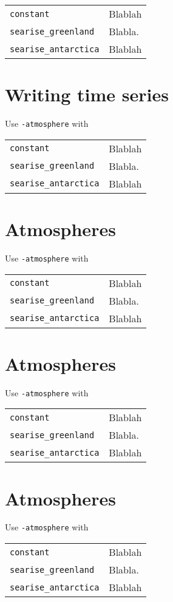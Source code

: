 \documentclass[landscape]{article}
\begin{document}
\begin{multicols}{3}
\begin{tabular}{@{}ll@{}}
\verb|constant|    & Blablah \\
\verb|searise_greenland|  & Blabla. \\
\verb|searise_antarctica|  & Blablah
\end{tabular}

\section{Writing time series}
Use \verb|-atmosphere| with
 
\begin{tabular}{@{}ll@{}}
\verb|constant|    & Blablah \\
\verb|searise_greenland|  & Blabla. \\
\verb|searise_antarctica|  & Blablah
\end{tabular}

\section{Atmospheres}
Use \verb|-atmosphere| with
 
\begin{tabular}{@{}ll@{}}
\verb|constant|    & Blablah \\
\verb|searise_greenland|  & Blabla. \\
\verb|searise_antarctica|  & Blablah
\end{tabular}

\section{Atmospheres}
Use \verb|-atmosphere| with
 
\begin{tabular}{@{}ll@{}}
\verb|constant|    & Blablah \\
\verb|searise_greenland|  & Blabla. \\
\verb|searise_antarctica|  & Blablah
\end{tabular}

\section{Atmospheres}
Use \verb|-atmosphere| with
 
\begin{tabular}{@{}ll@{}}
\verb|constant|    & Blablah \\
\verb|searise_greenland|  & Blabla. \\
\verb|searise_antarctica|  & Blablah
\end{tabular}


\end{multicols}
\end{document}
